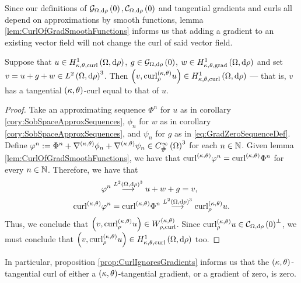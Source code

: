 Since our definitions of $\gradZero{\ddom}{\rho}, \curlZero{\ddom}{\rho}$ and tangential gradients and curls all depend on approximations by smooth functions, lemma \ref{lem:CurlOfGradSmoothFunctions} informs us that adding a gradient to an existing vector field will not change the curl of said vector field.
\begin{prop} \label{prop:CurlIgnoresGradients}
	Suppose that $u\in\ktcurlSob{\ddom}{\rho}$, $g\in\gradZero{\ddom}{\rho}$, $w\in\ktgradSob{\ddom}{\rho}$ and set $v = u + g + w\in\ltwo{\ddom}{\rho}^3$. 
	Then $\bracs{v, \ktcurl{\rho}u}\in\ktcurlSob{\ddom}{\rho}$ --- that is, $v$ has a tangential $\kt$-curl equal to that of $u$.
\end{prop}
\begin{proof}
	Take an approximating sequence $\Phi^n$ for $u$ as in corollary \ref{cory:SobSpaceApproxSequences}, $\phi_n$ for $w$ as in  corollary \ref{cory:SobSpaceApproxSequences}, and $\psi_n$ for $g$ as in \eqref{eq:GradZeroSequenceDef}.
	Define $\varphi^n := \Phi^n + \ktgrad\phi_n + \ktgrad\psi_n\in\psmooth{\ddom}^3$ for each $n\in\naturals$.
	Given lemma \ref{lem:CurlOfGradSmoothFunctions}, we have that $\ktcurl{}\varphi^n = \ktcurl{}\Phi^n$ for every $n\in\naturals$.
	Therefore, we have that
	\begin{align*}
		\varphi^n &\lconv{\ltwo{\ddom}{\rho}^3} u + w + g = v, \\
		\ktcurl{}\varphi^n &= \ktcurl{}\Phi^n 
		\lconv{\ltwo{\ddom}{\rho}^3} \ktcurl{\rho}u.
	\end{align*}
	Thus, we conclude that $\bracs{v, \ktcurl{\rho}u}\in W^{\kt}_{\rho, \mathrm{curl}}$.
	Since $\ktcurl{\rho}u\in\curlZero{\ddom}{\rho}^\perp$, we must conclude that $\bracs{ v, \ktcurl{\rho}u }\in\ktcurlSob{\ddom}{\rho}$ too.
\end{proof}
In particular, proposition \ref{prop:CurlIgnoresGradients} informs us that the $\kt$-tangential curl of either a $\kt$-tangential gradient, or a gradient of zero, is zero.
%
